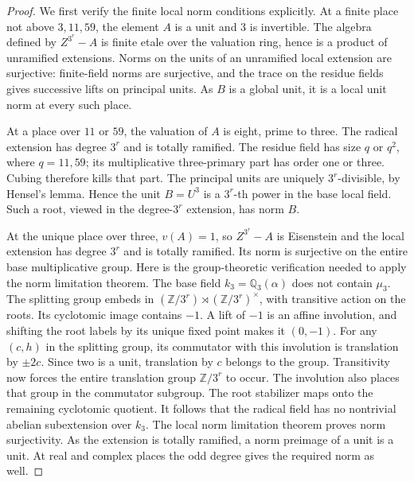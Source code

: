 \begin{proof}
We first verify the finite local norm conditions explicitly.  At
a finite place not above \(3,11,59\), the element \(A\) is a
unit and \(3\) is invertible.  The algebra defined by
\(Z^{3^r}-A\) is finite etale over the valuation ring, hence is
a product of unramified extensions.  Norms on the units of an
unramified local extension are surjective: finite-field norms are
surjective, and the trace on the residue fields gives successive
lifts on principal units.  As \(B\) is a global unit, it is a
local unit norm at every such place.

At a place over \(11\) or \(59\), the valuation of \(A\) is
eight, prime to three.  The radical extension has degree \(3^r\)
and is totally ramified.  The residue field has size \(q\) or
\(q^2\), where \(q=11,59\); its multiplicative three-primary
part has order one or three.  Cubing therefore kills that part.
The principal units are uniquely \(3^r\)-divisible, by Hensel's
lemma.  Hence the unit \(B=U^3\) is a \(3^r\)-th power in the
base local field.  Such a root, viewed in the degree-\(3^r\)
extension, has norm \(B\).

At the unique place over three, \(v(A)=1\), so
\(Z^{3^r}-A\) is Eisenstein and the local extension has degree
\(3^r\) and is totally ramified.  Its norm is surjective on the
entire base multiplicative group.  Here is the group-theoretic
verification needed to apply the norm limitation theorem.  The
base field \(k_3=\mathbb Q_3(\alpha)\) does not contain \(\mu_3\).
The splitting group embeds in
\((\mathbb Z/3^r)\rtimes(\mathbb Z/3^r)^\times\), with transitive action on
the roots.  Its cyclotomic image contains \(-1\).  A lift of
\(-1\) is an affine involution, and shifting the root labels
by its unique fixed point makes it \((0,-1)\).  For any
\((c,h)\) in the splitting group, its commutator with this
involution is translation by \(\pm2c\).  Since two is a unit,
translation by \(c\) belongs to the group.  Transitivity now
forces the entire translation group \(\mathbb Z/3^r\) to occur.
The involution also places that group in the commutator subgroup.
The root stabilizer maps onto the remaining cyclotomic quotient.
It follows that the radical field has no nontrivial abelian
subextension over \(k_3\).  The local norm limitation theorem
\cite[III, Theorem 3.5, pp.~108--109]{RootMilneCFT} proves norm
surjectivity.  As the extension is totally ramified, a norm
preimage of a unit is a unit.  At real and complex places the
odd degree gives the required norm as well.


\end{proof}
